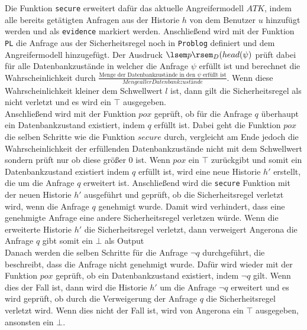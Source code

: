 \documentclass[german,version-2020-11]{uzl-thesis}
\begin{document}
Die Funktion \texttt{secure} erweitert dafür das aktuelle Angreifermodell $ATK$, indem alle bereits getätigten Anfragen aus der Historie $h$ von dem Benutzer $u$ hinzufügt werden und als \texttt{evidence} markiert werden. Anschließend wird mit der Funktion \texttt{PL} die Anfrage aus der Sicherheitsregel noch in \texttt{Problog} definiert und dem Angreifermodell hinzugefügt. Der Ausdruck $\lsem p \rsem_D (head(\psi)$ prüft dabei für alle Datenbankzustände in welcher die Anfrage $\psi$ erfüllt ist und berechnet die Wahrscheinlichkeit durch $\frac{\text{Menge der Datenbankzustände in den $\psi$ erfüllt ist}}{Menge aller Datenbankzustände}$. Wenn diese Wahrscheinlichkeit kleiner dem Schwellwert $l$ ist, dann gilt die Sicherheitsregel als nicht verletzt und es wird ein $\top$ ausgegeben. \\ 
Anschließend wird mit der Funktion $pox$ geprüft, ob für die  Anfrage $q$ überhaupt ein Datenbankzustand existiert, indem $q$ erfüllt ist. Dabei geht die Funktion $pox$ die selben Schritte wie die Funktion $secure$ durch, vergleicht am Ende jedoch die Wahrscheinlichkeit der erfüllenden Datenbankzustände nicht mit dem Schwellwert sondern prüft nur ob diese größer 0 ist. Wenn $pox$ ein $\top$ zurückgibt und somit ein Datenbankzustand existiert indem $q$ erfüllt ist, wird eine neue Historie $h'$ erstellt, die um die Anfrage $q$ erweitert ist. Anschließend wird die \texttt{secure} Funktion mit der neuen Historie $h'$ ausgeführt und geprüft, ob die Sicherheitsregel verletzt wird, wenn die Anfrage $q$ genehmigt wurde. Damit wird verhindert, dass eine genehmigte Anfrage eine andere Sicherheitsregel verletzen würde. Wenn die erweiterte Historie $h'$ die Sicherheitsregel verletzt, dann verweigert Angerona die Anfrage $q$ gibt somit ein $\bot$ als Output \\ 
Danach werden die selben Schritte für die Anfrage $\neg q$ durchgeführt, die beschreibt, dass die Anfrage nicht genehmigt wurde. Dafür wird wieder mit der Funktion $pox$ geprüft, ob ein Datenbankzustand existiert, indem $ \neg q$ gilt. Wenn dies der Fall ist, dann wird die Historie $h'$ um die Anfrage $\neg q$ erweitert und es wird geprüft, ob durch die Verweigerung der Anfrage $q$ die Sicherheitsregel verletzt wird. Wenn dies nicht der Fall ist, wird von Angerona ein $\top$ ausgegeben, ansonsten ein $\bot$. \\ \\ 
\end{document}

